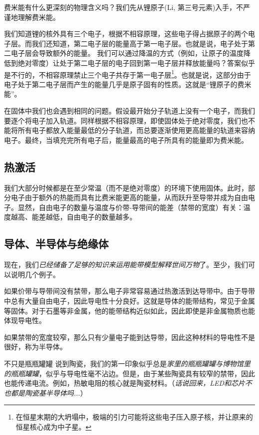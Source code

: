 费米能有什么更深刻的物理含义吗？我们先从锂原子(Li, 第三号元素)入手，不严谨地理解费米能。

我们知道锂的核外具有三个电子，根据不相容原理，这些电子得占据原子的两个电子层。而我们还知道，第二电子层的能量高于第一电子层。也就是说，电子处于第二电子层会导致额外的能量。
我们可以通过降温的方式（例如，让原子的温度降低到绝对零度）让处于第二电子层的电子回到第一电子层并释放能量吗？答案似乎是不行的，不相容原理禁止三个电子共存于第一电子层\footnote{在恒星末期的大坍塌中，极端的引力可能将这些电子压入原子核，并让原来的恒星核心成为中子星。}。也就是说，这部分由于电子处于第二电子层而产生的能量几乎是原子固有的性质。这就是“锂原子的费米能”。

在固体中我们也会遇到相同的问题。假设最开始分子轨道上没有一个电子，而我们要逐个将电子加入轨道。同样根据不相容原理，即使固体处于绝对零度，我们也不能将所有电子都放入能量最低的分子轨道，而总要逐渐使用更高能量的轨道来容纳电子。最终，当填充完所有电子后，能量最高的电子所具有的能量即为费米能。

\subsection{热激活}
我们大部分时候都是在至少常温（而不是绝对零度）的环境下使用固体。此时，部分电子由于额外的热能而具有比费米能更高的能量，从而跃升至导带并成为自由电子。显然，自由电子的数量与温度与价带-导带间的能差（禁带的宽度）有关：温度越高、能差越低，自由电子的数量越多。

\subsection{导体、半导体与绝缘体}
现在，我们\textsl{已经储备了足够的知识来运用能带模型解释世间万物}了。至少，我们可以说明几个例子。

如果价带与导带间没有禁带，那么电子非常容易通过热激活到达导带中。由于导带中总有大量自由电子，因此导电性十分良好。这就是导体的能带结构，常见于金属等固体。对于石墨等非金属，他的能带结构近似如此，因此即使是非金属物质也能体现导电性。

如果禁带的宽度较窄，那么只有少量电子能到达导带，因此这种材料的导电性不是很好，称为半导体。

\begin{example}{不只是瓶瓶罐罐}
说到陶瓷，我们的第一印象似乎总是\textsl{家里的瓶瓶罐罐与博物馆里的瓶瓶罐罐}，似乎与导电性毫不沾边。但是，由于某些陶瓷具有较窄的禁带，因此也能传递电流。例如，热敏电阻的核心就是陶瓷材料。（\textsl{话说回来，LED和芯片不也都是陶瓷基半导体吗...}）
\end{example}

